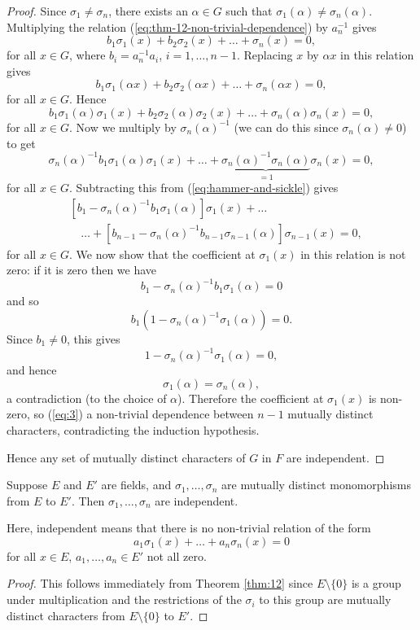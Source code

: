 \begin{theorem}
\begin{proof}
		Since $\sigma_1 \neq \sigma_n$, there exists an $\alpha \in G$ such that $\sigma_1(\alpha) \neq \sigma_n(\alpha)$. Multiplying the relation (\ref{eq:thm-12-non-trivial-dependence}) by $a_n^{-1}$ gives
		\begin{equation}\label{eq:hammer-and-sickle}
			b_1 \sigma_1(x) + b_2 \sigma_2(x) + \dots + \sigma_n(x) = 0,
		\end{equation}
		for all $x \in G$, where $b_i = a_n^{-1} a_i$, $i = 1, \dots, n - 1$. Replacing $x$ by $\alpha x$ in this relation gives
		\[
			b_1 \sigma_1(\alpha x) + b_2 \sigma_2(\alpha x) + \dots + \sigma_n(\alpha x) = 0,
		\]
		for all $x \in G$. Hence
		\[
			b_1 \sigma_1(\alpha) \sigma_1(x) + b_2 \sigma_2(\alpha) \sigma_2(x) + \dots + \sigma_n(\alpha) \sigma_n(x) = 0,
		\]
		for all $x \in G$. Now we multiply by $\sigma_n(\alpha)^{-1}$ (we can do this since $\sigma_n(\alpha) \neq 0$) to get
		\[
			\sigma_n(\alpha)^{-1} b_1 \sigma_1(\alpha) \sigma_1(x) + \dots + \underbrace{\sigma_n(\alpha)^{-1} \sigma_n(\alpha)}_{= 1} \sigma_n(x) = 0,
		\]
		for all $x \in G$. Subtracting this from (\ref{eq:hammer-and-sickle}) gives
		\begin{align}
			&[b_1 - \sigma_n(\alpha)^{-1} b_1 \sigma_1(\alpha)] \sigma_1(x) + \dots \nonumber \\
			& \quad \dots + [b_{n - 1} - \sigma_n(\alpha)^{-1} b_{n - 1} \sigma_{n - 1}(\alpha)] \sigma_{n - 1}(x) = 0, \label{eq:3}
		\end{align}
		for all $x \in G$. We now show that the coefficient at $\sigma_1(x)$ in this relation is not zero: if it is zero then we have
		\[
			b_1 - \sigma_n(\alpha)^{-1} b_1 \sigma_1(\alpha) = 0
		\]
		and so
		\[
			b_1 (1 - \sigma_n(\alpha)^{-1} \sigma_1(\alpha)) = 0.
		\]
		Since $b_1 \neq 0$, this gives
		\[
			1 - \sigma_n(\alpha)^{-1} \sigma_1(\alpha) = 0,
		\]
		and hence
		\[
			\sigma_1(\alpha) = \sigma_n(\alpha),
		\]
		a contradiction (to the choice of $\alpha$). Therefore the coefficient at $\sigma_1(x)$ is non-zero, so (\ref{eq:3}) a non-trivial dependence between $n - 1$ mutually distinct characters, contradicting the induction hypothesis.
		
		Hence any set of mutually distinct characters of $G$ in $F$ are independent.
	\end{proof}
\end{theorem}

\begin{corollary}
	Suppose $E$ and $E'$ are fields, and $\sigma_1, \dots, \sigma_n$ are mutually distinct monomorphisms from $E$ to $E'$. Then $\sigma_1, \dots, \sigma_n$ are independent.
	
	Here, independent means that there is no non-trivial relation of the form
	\[
		a_1 \sigma_1(x) + \dots + a_n \sigma_n(x) = 0
	\]
	for all $x \in E$, $a_1, \dots, a_n \in E'$ not all zero.
	\begin{proof}
		This follows immediately from Theorem \ref{thm:12} since $E \setminus \{0\}$ is a group under multiplication and the restrictions of the $\sigma_i$ to this group are mutually distinct characters from $E \setminus \{0\}$ to $E'$.
	\end{proof}
\end{corollary}

